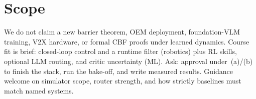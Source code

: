\documentclass[11pt]{article}
\begin{document}
\section{Scope}
We do not claim a new barrier theorem, OEM deployment, foundation-VLM training, V2X hardware, or formal CBF proofs under learned dynamics. Course fit is brief: closed-loop control and a runtime filter (robotics) plus RL skills, optional LLM routing, and critic uncertainty (ML). Ask: approval under~(a)/(b) to finish the stack, run the bake-off, and write measured results. Guidance welcome on simulator scope, router strength, and how strictly baselines must match named systems.

\clearpage


\end{document}
